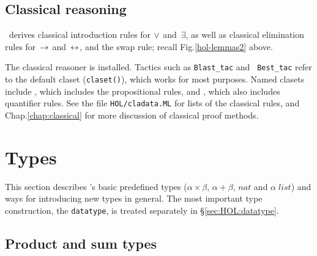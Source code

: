 \subsection{Classical reasoning}

\HOL\ derives classical introduction rules for $\vee$ and~$\exists$, as
well as classical elimination rules for~$\rightarrow$ and~$\leftrightarrow$, and the swap
rule; recall Fig.\ts\ref{hol-lemmas2} above.

The classical reasoner is installed.  Tactics such as \texttt{Blast_tac} and {\tt
Best_tac} refer to the default claset (\texttt{claset()}), which works for most
purposes.  Named clasets include , which includes the
propositional rules, and , which also includes quantifier
rules.  See the file \texttt{HOL/cladata.ML} for lists of the classical rules,
and %
{Chap.\ts\ref{chap:classical}} for more discussion of classical proof methods.


\section{Types}\label{sec:HOL:Types}
This section describes \HOL's basic predefined types ($\alpha \times
\beta$, $\alpha + \beta$, $nat$ and $\alpha \; list$) and ways for
introducing new types in general.  The most important type
construction, the \texttt{datatype}, is treated separately in
\S\ref{sec:HOL:datatype}.


\subsection{Product and sum types}
\label{subsec:prod-sum}

